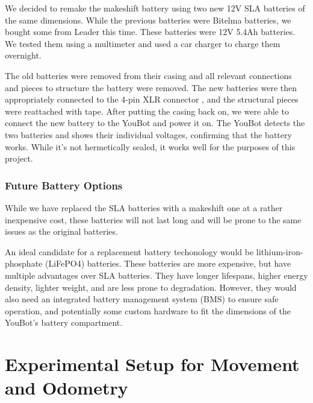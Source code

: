 \documentclass[a4paper, 12pt]{article}
\newif\ifshownotes
\newcommand{\notes}[1]{\ifshownotes\textcolor{blue}{#1}\fi}
\begin{document}
    We decided to remake the makeshift battery using two new 12V SLA batteries of the same dimensions. While the previous batteries were Bitelma batteries, we bought some from Leader this time. These batteries were 12V 5.4Ah batteries. We tested them using a multimeter and used a car charger to charge them overnight. 
    
    The old batteries were removed from their casing and all relevant connections and pieces to structure the battery were removed. The new batteries were then appropriately connected to the 4-pin XLR connector \notes{maybe mention the pinout here?}, and the structural pieces were reattached with tape. After putting the casing back on, we were able to connect the new battery to the YouBot and power it on. The YouBot detects the two batteries and shows their individual voltages, confirming that the battery works. While it's not hermetically sealed, it works well for the purposes of this project. 

    \subsubsection{Future Battery Options}

    While we have replaced the SLA batteries with a makeshift one at a rather inexpensive cost, these batteries will not last long and will be prone to the same issues as the original batteries. 

    An ideal candidate for a replacement battery techonology would be lithium-iron-phosphate (LiFePO4) batteries. These batteries are more expensive, but have multiple advantages over SLA batteries. They have longer lifespans, higher energy density, lighter weight, and are less prone to degradation. However, they would also need an integrated battery management system (BMS) to ensure safe operation, and potentially some custom hardware to fit the dimensions of the YouBot's battery compartment. 

    
    \section{Experimental Setup for Movement and Odometry}

    \notes{here, ill discuss the experimental setup for testing movement and odometry.  this should include the two experiments of moving linearly and rotating, and discuss how error is calculated. probably discuss negative feedback and PID control as well, random, percentage, consistent error, etc.}
\end{document}

